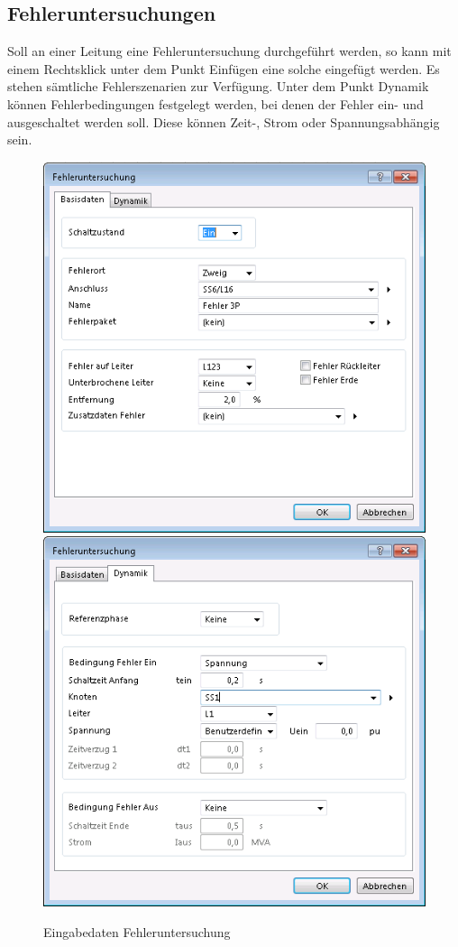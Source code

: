 \documentclass{scrartcl}
\begin{document}
\begin{onehalfspace}
\subsection{Fehleruntersuchungen}
Soll an einer Leitung eine Fehleruntersuchung durchgeführt werden, so kann mit einem Rechtsklick unter dem Punkt Einfügen eine solche eingefügt werden. Es stehen sämtliche Fehlerszenarien zur Verfügung. Unter dem Punkt Dynamik können Fehlerbedingungen festgelegt werden, bei denen der Fehler ein- und ausgeschaltet werden soll. Diese können Zeit-, Strom oder Spannungsabhängig sein.

	\begin{figure}[H]
	\centering
	\includegraphics[scale=0.4]{img/fehleruntersuchung-basis.png}
	\includegraphics[scale=0.4]{img/fehleruntersuchung-dyn.png}
	\caption{Eingabedaten Fehleruntersuchung}
	\end{figure}


\end{onehalfspace}
\end{document}
